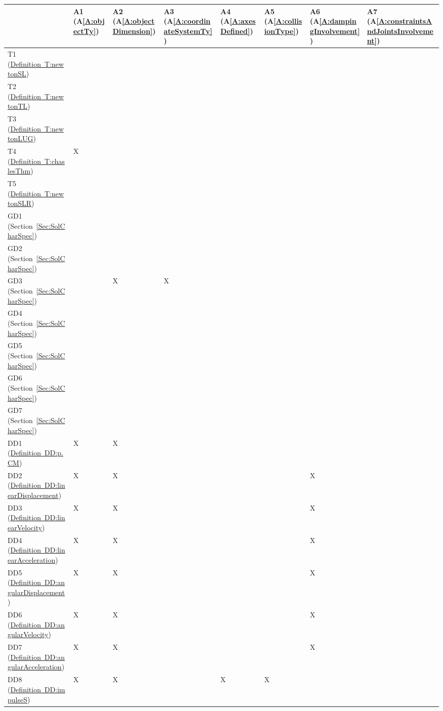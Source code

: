 \documentclass[12pt]{article}
\begin{document}
\begin{longtable}{l l l l l l l l}
\toprule
 & A1 (A\ref{A:objectTy}) & A2 (A\ref{A:objectDimension}) & A3 (A\ref{A:coordinateSystemTy}) & A4 (A\ref{A:axesDefined}) & A5 (A\ref{A:collisionType}) & A6 (A\ref{A:dampingInvolvement}) & A7 (A\ref{A:constraintsAndJointsInvolvement})
\\
\midrule
T1 (\hyperref[T:newtonSL]{Definition~T:newtonSL}) &  &  &  &  &  &  & 
\\
T2 (\hyperref[T:newtonTL]{Definition~T:newtonTL}) &  &  &  &  &  &  & 
\\
T3 (\hyperref[T:newtonLUG]{Definition~T:newtonLUG}) &  &  &  &  &  &  & 
\\
T4 (\hyperref[T:chaslesThm]{Definition~T:chaslesThm}) & X &  &  &  &  &  & 
\\
T5 (\hyperref[T:newtonSLR]{Definition~T:newtonSLR}) &  &  &  &  &  &  & 
\\
GD1 (Section~\ref{Sec:SolCharSpec}) &  &  &  &  &  &  & 
\\
GD2 (Section~\ref{Sec:SolCharSpec}) &  &  &  &  &  &  & 
\\
GD3 (Section~\ref{Sec:SolCharSpec}) &  & X & X &  &  &  & 
\\
GD4 (Section~\ref{Sec:SolCharSpec}) &  &  &  &  &  &  & 
\\
GD5 (Section~\ref{Sec:SolCharSpec}) &  &  &  &  &  &  & 
\\
GD6 (Section~\ref{Sec:SolCharSpec}) &  &  &  &  &  &  & 
\\
GD7 (Section~\ref{Sec:SolCharSpec}) &  &  &  &  &  &  & 
\\
DD1 (\hyperref[DD:p.CM]{Definition~DD:p.CM}) & X & X &  &  &  &  & 
\\
DD2 (\hyperref[DD:linearDisplacement]{Definition~DD:linearDisplacement}) & X & X &  &  &  & X & 
\\
DD3 (\hyperref[DD:linearVelocity]{Definition~DD:linearVelocity}) & X & X &  &  &  & X & 
\\
DD4 (\hyperref[DD:linearAcceleration]{Definition~DD:linearAcceleration}) & X & X &  &  &  & X & 
\\
DD5 (\hyperref[DD:angularDisplacement]{Definition~DD:angularDisplacement}) & X & X &  &  &  & X & 
\\
DD6 (\hyperref[DD:angularVelocity]{Definition~DD:angularVelocity}) & X & X &  &  &  & X & 
\\
DD7 (\hyperref[DD:angularAcceleration]{Definition~DD:angularAcceleration}) & X & X &  &  &  & X & 
\\
DD8 (\hyperref[DD:impulseS]{Definition~DD:impulseS}) & X & X &  & X & X &  & 

\end{longtable}
\end{document}
